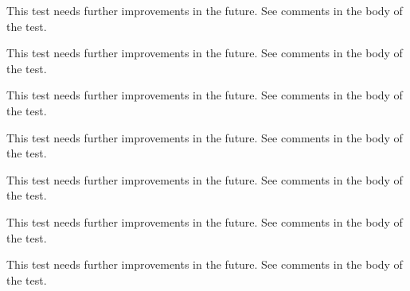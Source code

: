 \begin{DoxyRefList}
%
 This test needs further improvements in the future. See comments in the body of the test.  
\item[Subprogram \mbox{\hyperlink{namespaceTest__System__mod_a733db17082cd5058dbc8d19e6f620909}{Test\+\_\+\+System\+\_\+mod\+::test\+\_\+execute\+Cmd\+\_\+2}} ()]\label{todo__todo000073}%
%
 This test needs further improvements in the future. See comments in the body of the test.  
\item[Subprogram \mbox{\hyperlink{namespaceTest__System__mod_a9a276bf5a7b9db66c140bd2202ebc7e9}{Test\+\_\+\+System\+\_\+mod\+::test\+\_\+get\+System\+Info\+\_\+1}} ()]\label{todo__todo000074}%
%
 This test needs further improvements in the future. See comments in the body of the test.  
\item[Subprogram \mbox{\hyperlink{namespaceTest__System__mod_aabfd080659733c4a852c62ccd400599b}{Test\+\_\+\+System\+\_\+mod\+::test\+\_\+\+OS\+\_\+type\+\_\+1}} ()]\label{todo__todo000068}%
%
 This test needs further improvements in the future. See comments in the body of the test.  
\item[Subprogram \mbox{\hyperlink{namespaceTest__System__mod_a86976d55b3a779d9a8c0064155e9cd4a}{Test\+\_\+\+System\+\_\+mod\+::test\+\_\+\+OS\+\_\+type\+\_\+2}} ()]\label{todo__todo000069}%
%
 This test needs further improvements in the future. See comments in the body of the test.  
\item[Subprogram \mbox{\hyperlink{namespaceTest__System__mod_ada729e6f3789a1df730ac21f58d5a334}{Test\+\_\+\+System\+\_\+mod\+::test\+\_\+\+OS\+\_\+type\+\_\+3}} ()]\label{todo__todo000070}%
%
 This test needs further improvements in the future. See comments in the body of the test.  
\item[Subprogram \mbox{\hyperlink{namespaceTest__System__mod_a6ba8a4348e2457b775dd061d40f33cb8}{Test\+\_\+\+System\+\_\+mod\+::test\+\_\+\+Sys\+Cmd\+\_\+type\+\_\+1}} ()]\label{todo__todo000071}%
%
 This test needs further improvements in the future. See comments in the body of the test. 
\end{DoxyRefList}